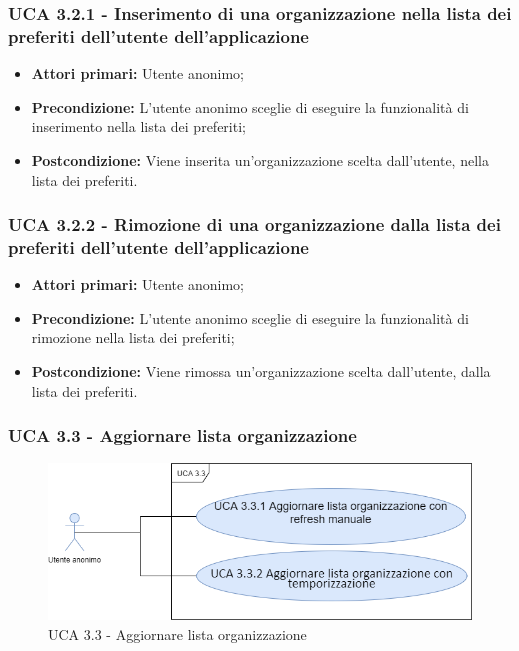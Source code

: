 \subsubsection{UCA 3.2.1 - Inserimento di una organizzazione nella lista dei preferiti dell'utente dell'applicazione}%
\begin{itemize}
	\item \textbf{Attori primari:} Utente anonimo;
	\item \textbf{Precondizione:} L'utente anonimo sceglie di eseguire la funzionalità di inserimento nella lista dei preferiti; 
	\item \textbf{Postcondizione:} Viene inserita un'organizzazione scelta dall'utente, nella lista dei preferiti.
\end{itemize}

\subsubsection{UCA 3.2.2 - Rimozione di una organizzazione dalla lista dei preferiti dell'utente dell'applicazione}%
\begin{itemize}
	\item \textbf{Attori primari:} Utente anonimo;
	\item \textbf{Precondizione:}  L'utente anonimo sceglie di eseguire la funzionalità di rimozione nella lista dei preferiti;
	\item \textbf{Postcondizione:} Viene rimossa un'organizzazione scelta dall'utente, dalla lista dei preferiti.
\end{itemize}



\subsubsection{UCA 3.3 - Aggiornare lista organizzazione}%

\begin{figure}[h]
	\centering
	\includegraphics[scale=0.5]{sezioni/UseCase/Immagini/UCA3.3.png}
	\caption{UCA 3.3 - Aggiornare lista organizzazione}
\end{figure}

